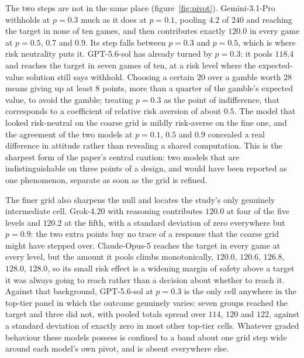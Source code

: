 \documentclass[openacc]{rsproca_new}
\begin{document}
The two steps are not in the same place (figure~\ref{fig:pivot}). Gemini-3.1-Pro withholds at $p=0.3$ much as it does at $p=0.1$, pooling $4.2$ of $240$ and reaching the target in none of ten games, and then contributes exactly $120.0$ in every game at $p=0.5$, $0.7$ and $0.9$. Its step falls between $p=0.3$ and $p=0.5$, which is where risk neutrality puts it. GPT-5.6-sol has already turned by $p=0.3$: it pools $118.4$ and reaches the target in seven games of ten, at a risk level where the expected-value solution still says withhold. Choosing a certain $20$ over a gamble worth $28$ means giving up at least $8$ points, more than a quarter of the gamble's expected value, to avoid the gamble; treating $p=0.3$ as the point of indifference, that corresponds to a coefficient of relative risk aversion of about $0.5$. The model that looked risk-neutral on the coarse grid is mildly risk-averse on the fine one, and the agreement of the two models at $p=0.1$, $0.5$ and $0.9$ concealed a real difference in attitude rather than revealing a shared computation. This is the sharpest form of the paper's central caution: two models that are indistinguishable on three points of a design, and would have been reported as one phenomenon, separate as soon as the grid is refined.

The finer grid also sharpens the null and locates the study's only genuinely intermediate cell. Grok-4.20 with reasoning contributes $120.0$ at four of the five levels and $120.2$ at the fifth, with a standard deviation of zero everywhere but $p=0.9$: the two extra points buy no trace of a response that the coarse grid might have stepped over. Claude-Opus-5 reaches the target in every game at every level, but the amount it pools climbs monotonically, $120.0$, $120.6$, $126.8$, $128.0$, $128.0$, so its small risk effect is a widening margin of safety above a target it was always going to reach rather than a decision about whether to reach it. Against that background, GPT-5.6-sol at $p=0.3$ is the only cell anywhere in the top-tier panel in which the outcome genuinely varies: seven groups reached the target and three did not, with pooled totals spread over $114$, $120$ and $122$, against a standard deviation of exactly zero in most other top-tier cells. Whatever graded behaviour these models possess is confined to a band about one grid step wide around each model's own pivot, and is absent everywhere else.
\end{document}
